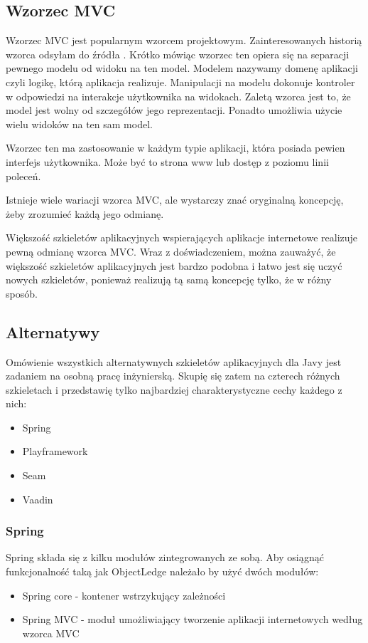 \documentclass[a4paper,onecolumn,oneside,11pt,wide,floatssmall]{mwrep}
\theoremstyle{definition}
\theoremstyle{plain}%
\theoremstyle{remark}
\begin{document}
\subsection{Wzorzec MVC}
\label{wzorzec-mvc}
Wzorzec MVC jest popularnym wzorcem projektowym. Zainteresowanych historią wzorca odsyłam do źródła \cite{mvcHistory}. Krótko mówiąc wzorzec ten opiera się na separacji pewnego modelu od widoku na ten model. Modelem nazywamy domenę aplikacji czyli logikę, którą aplikacja realizuje. Manipulacji na modelu dokonuje kontroler w odpowiedzi na interakcje użytkownika na widokach. Zaletą wzorca jest to, że model jest wolny od szczegółów jego reprezentacji. Ponadto umożliwia użycie wielu widoków na ten sam model.

Wzorzec ten ma zastosowanie w każdym typie aplikacji, która posiada pewien interfejs użytkownika. Może być to strona www lub dostęp z poziomu linii poleceń.

Istnieje wiele wariacji wzorca MVC, ale wystarczy znać oryginalną koncepcję, żeby zrozumieć każdą jego odmianę.

Większość szkieletów aplikacyjnych wspierających aplikacje internetowe realizuje pewną odmianę wzorca MVC. Wraz z doświadczeniem, można zauważyć, że większość szkieletów aplikacyjnych jest bardzo podobna i łatwo jest się uczyć nowych szkieletów, ponieważ realizują tą samą koncepcję tylko, że w różny sposób.

\subsection{Alternatywy}
Omówienie wszystkich alternatywnych szkieletów aplikacyjnych dla Javy jest zadaniem na osobną pracę inżynierską. Skupię się zatem na czterech różnych szkieletach i przedstawię tylko najbardziej charakterystyczne cechy każdego z nich:
\begin{itemize}
  \item Spring
  \item Playframework
  \item Seam
  \item Vaadin
\end{itemize}

\subsubsection{Spring}
Spring \cite{springHome} składa się z kilku modułów zintegrowanych ze sobą. Aby osiągnąć funkcjonalność taką jak ObjectLedge należało by użyć dwóch modułów:
\begin{itemize}
  \item Spring core - kontener wstrzykujący zależności
  \item Spring MVC - moduł umożliwiający tworzenie aplikacji internetowych według wzorca MVC
\end{itemize}
\end{document}
